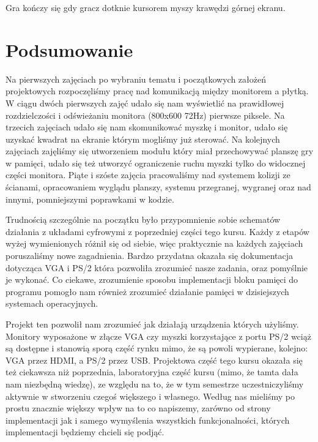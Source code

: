 \documentclass[a4paper]{article}
\begin{document}
Gra kończy się gdy gracz dotknie kursorem myszy krawędzi górnej ekranu.

\section{Podsumowanie}

Na pierwszych zajęciach po wybraniu tematu i początkowych założeń projektowych rozpoczęliśmy pracę nad komunikacją między monitorem a płytką. W ciągu dwóch pierwszych zajęć udało się nam wyświetlić na prawidłowej rozdzielczości i odświeżaniu monitora (800x600 72Hz) pierwsze piksele. Na trzecich zajęciach udało się nam skomunikować myszkę i monitor, udało się uzyskać kwadrat na ekranie którym mogliśmy już sterować. Na kolejnych zajęciach zajęliśmy się utworzeniem modułu który miał przechowywać planszę gry w pamięci, udało się też utworzyć ograniczenie ruchu myszki tylko do widocznej części monitora. Piąte i szóste zajęcia pracowaliśmy nad systemem kolizji ze ścianami, opracowaniem wyglądu planszy, systemu przegranej, wygranej oraz nad innymi, pomniejszymi poprawkami w kodzie.

Trudnością szczególnie na początku było przypomnienie sobie schematów działania z układami cyfrowymi z poprzedniej części tego kursu. Każdy z etapów wyżej wymienionych różnił się od siebie, więc praktycznie na każdych zajęciach poruszaliśmy nowe zagadnienia. Bardzo przydatna okazała się dokumentacja dotycząca VGA i PS/2 która pozwoliła zrozumieć nasze zadania, oraz pomyślnie je wykonać. Co ciekawe, zrozumienie sposobu implementacji bloku pamięci do programu pomogło nam również zrozumieć działanie pamięci w dzisiejszych systemach operacyjnych.

Projekt ten pozwolił nam zrozumieć jak działają urządzenia których użyliśmy. Monitory wyposażone w złącze VGA czy myszki korzystające z portu PS/2 wciąż są dostępne i stanowią sporą część rynku mimo, że są powoli wypierane, kolejno: VGA przez HDMI, a PS/2 przez USB. Projektowa część tego kursu okazała się też ciekawsza niż poprzednia, laboratoryjna część kursu (mimo, że tamta dała nam niezbędną wiedzę), ze względu na to, że w tym semestrze uczestniczyliśmy aktywnie w stworzeniu czegoś większego i własnego. Według nas mieliśmy po prostu znacznie większy wpływ na to co napiszemy, zarówno od strony implementacji jak i samego wymyślenia wszystkich funkcjonalności, których implementacji będziemy chcieli się podjąć.
\end{document}

